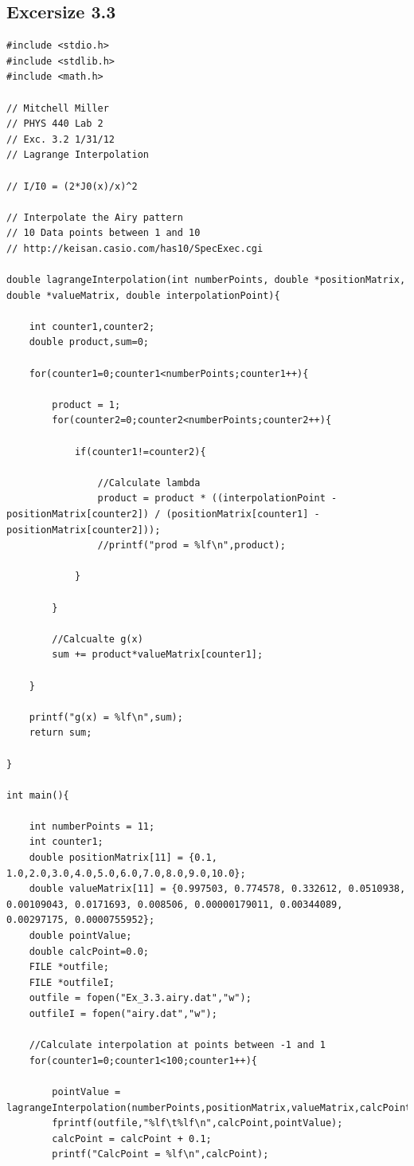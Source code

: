 \documentclass[12pt]{article}
\begin{document}
\subsection{Excersize 3.3}
\begin{verbatim}
#include <stdio.h>
#include <stdlib.h>
#include <math.h>

// Mitchell Miller
// PHYS 440 Lab 2
// Exc. 3.2 1/31/12
// Lagrange Interpolation

// I/I0 = (2*J0(x)/x)^2

// Interpolate the Airy pattern
// 10 Data points between 1 and 10
// http://keisan.casio.com/has10/SpecExec.cgi

double lagrangeInterpolation(int numberPoints, double *positionMatrix, double *valueMatrix, double interpolationPoint){

	int counter1,counter2;
	double product,sum=0;

	for(counter1=0;counter1<numberPoints;counter1++){

		product = 1;
		for(counter2=0;counter2<numberPoints;counter2++){

			if(counter1!=counter2){

				//Calculate lambda
				product = product * ((interpolationPoint - positionMatrix[counter2]) / (positionMatrix[counter1] - positionMatrix[counter2]));
				//printf("prod = %lf\n",product);

			}
			
		}

		//Calcualte g(x)
		sum += product*valueMatrix[counter1];

	}

	printf("g(x) = %lf\n",sum);
	return sum;

}

int main(){

	int numberPoints = 11;
	int counter1;
	double positionMatrix[11] = {0.1, 1.0,2.0,3.0,4.0,5.0,6.0,7.0,8.0,9.0,10.0};
	double valueMatrix[11] = {0.997503, 0.774578, 0.332612, 0.0510938, 0.00109043, 0.0171693, 0.008506, 0.00000179011, 0.00344089, 0.00297175, 0.0000755952};
	double pointValue;
	double calcPoint=0.0;
	FILE *outfile;
	FILE *outfileI;
	outfile = fopen("Ex_3.3.airy.dat","w");
	outfileI = fopen("airy.dat","w");

	//Calculate interpolation at points between -1 and 1
	for(counter1=0;counter1<100;counter1++){
		
		pointValue = lagrangeInterpolation(numberPoints,positionMatrix,valueMatrix,calcPoint);
		fprintf(outfile,"%lf\t%lf\n",calcPoint,pointValue);
		calcPoint = calcPoint + 0.1;
		printf("CalcPoint = %lf\n",calcPoint);


\end{verbatim}
\end{document}
